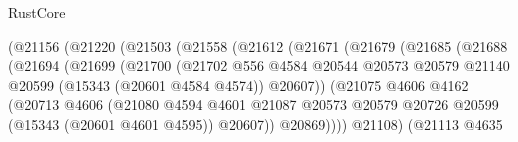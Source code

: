 \begin{lexlean}{RustCore}
\begin{coremodule}
                                  (@21156
                                    (@21220
                                      (@21503
                                        (@21558
                                          (@21612
                                            (@21671
                                              (@21679
                                                (@21685
                                                  (@21688
                                                    (@21694
                                                      (@21699
                                                        (@21700
                                                          (@21702
                                                            @556
                                                            @4584
                                                            @20544
                                                            @20573
                                                            @20579
                                                            @21140
                                                            @20599
                                                            (@15343 (@20601 @4584 @4574))
                                                            @20607))
                                                        (@21075
                                                          @4606
                                                          @4162
                                                          (@20713
                                                            @4606
                                                            (@21080
                                                              @4594
                                                              @4601
                                                              @21087
                                                              @20573
                                                              @20579
                                                              @20726
                                                              @20599
                                                              (@15343 (@20601 @4601 @4595))
                                                              @20607))
                                                          @20869))))
                                                  @21108)
                                                (@21113
                                                  @4635

\end{coremodule}
\end{lexlean}
